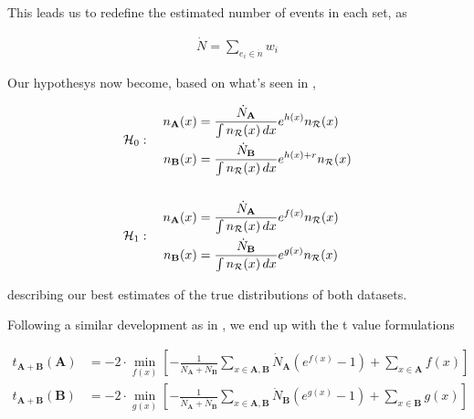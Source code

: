 \documentclass{article}
\begin{document}
This leads us to redefine the estimated number of events in each set, as

$$
\begin{aligned}
\dot{N} = \sum\limits_{e_i \in \dot{n}} w_i
\end{aligned}
$$

Our hypothesys now become, based on what's seen in \cite{LastDDPpaper},

$$
\begin{aligned}
    \mathcal{H}_{0} &: \quad
    \begin{aligned}
        n_{\mathbf{A}}(x) &= \dfrac{\dot{N}_{\mathbf{A}}}{\int n_{\mathcal{R}}(x)\, dx} e^{h(x)} n_{\mathcal{R}}(x) \\
        n_{\mathbf{B}}(x) &= \dfrac{\dot{N}_{\mathbf{B}}}{\int n_{\mathcal{R}}(x)\, dx} e^{h(x) + r} n_{\mathcal{R}}(x)        
    \end{aligned}
    \\\vspace{1em}\\
    \mathcal{H}_{1} &: \quad
    \begin{aligned}
        n_{\mathbf{A}}(x) &= \dfrac{\dot{N}_{\mathbf{A}}}{\int n_{\mathcal{R}}(x)\, dx} e^{f(x)} n_{\mathcal{R}}(x) \\
        n_{\mathbf{B}}(x) &= \dfrac{\dot{N}_{\mathbf{B}}}{\int n_{\mathcal{R}}(x)\, dx} e^{g(x)} n_{\mathcal{R}}(x)
    \end{aligned}
\end{aligned}
$$

describing our best estimates of the true distributions of both datasets.

Following a similar development as in \cite{LastDDPpaper}, we end up with the t value formulations

$$
\begin{aligned}
    t_{\mathbf{A}+\mathbf{B}}(\mathbf{A}) &= -2 \cdot \min_{f(x)}
    \left[
        - \frac{1}{\dot{N}_{\mathbf{A}} + \dot{N}_{\mathbf{B}}}
        \sum_{x \in \mathbf{A}, \mathbf{B}} \dot{N}_{\mathbf{A}} \left( e^{f(x)} - 1 \right)
        + \sum_{x \in \mathbf{A}} f(x)
    \right]
    \\
    t_{\mathbf{A}+\mathbf{B}}(\mathbf{B}) &= -2 \cdot \min_{g(x)}
    \left[
        - \frac{1}{\dot{N}_{\mathbf{A}} + \dot{N}_{\mathbf{B}}}
        \sum_{x \in \mathbf{A}, \mathbf{B}} \dot{N}_{\mathbf{B}} \left( e^{g(x)} - 1 \right)
        + \sum_{x \in \mathbf{B}} g(x)
    \right]
\end{aligned}
$$
\end{document}
